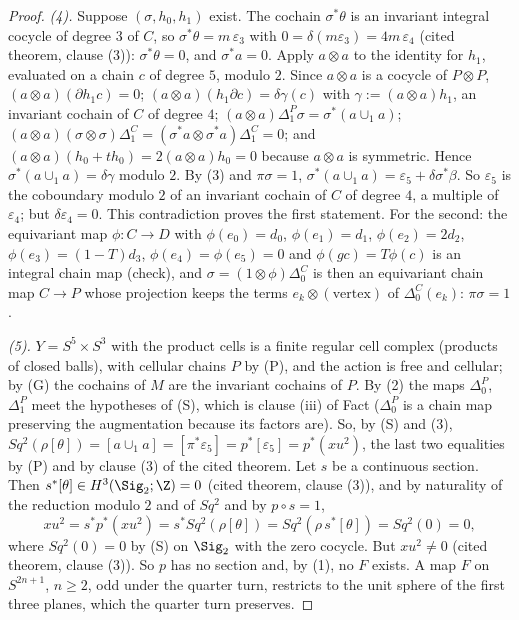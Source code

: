 \begin{proof}
\emph{(4).} Suppose $(\sigma, h_{0}, h_{1})$ exist. The cochain $\sigma^{*}\theta$ is an invariant integral cocycle of degree $3$ of $C$, so $\sigma^{*}\theta = m\,\varepsilon_{3}$ with $0 = \delta(m\varepsilon_{3}) = 4m\,\varepsilon_{4}$ (cited theorem, clause (3)): $\sigma^{*}\theta = 0$, and $\sigma^{*}a = 0$. Apply $a \otimes a$ to the identity for $h_{1}$, evaluated on a chain $c$ of degree $5$, modulo $2$. Since $a \otimes a$ is a cocycle of $P \otimes P$, $(a \otimes a)(\partial h_{1}c) = 0$; $(a \otimes a)(h_{1}\partial c) = \delta\gamma(c)$ with $\gamma := (a \otimes a)h_{1}$, an invariant cochain of $C$ of degree $4$; $(a \otimes a)\Delta_{1}^{P}\sigma = \sigma^{*}(a \cup_{1} a)$; $(a \otimes a)(\sigma \otimes \sigma)\Delta_{1}^{C} = (\sigma^{*}a \otimes \sigma^{*}a)\Delta_{1}^{C} = 0$; and $(a \otimes a)(h_{0} + th_{0}) = 2(a \otimes a)h_{0} = 0$ because $a \otimes a$ is symmetric. Hence $\sigma^{*}(a \cup_{1} a) = \delta\gamma$ modulo $2$. By (3) and $\pi\sigma = 1$, $\sigma^{*}(a \cup_{1} a) = \varepsilon_{5} + \delta\sigma^{*}\beta$. So $\varepsilon_{5}$ is the coboundary modulo $2$ of an invariant cochain of $C$ of degree $4$, a multiple of $\varepsilon_{4}$; but $\delta\varepsilon_{4} = 0$. This contradiction proves the first statement. For the second: the equivariant map $\phi : C \to D$ with $\phi(e_{0}) = d_{0}$, $\phi(e_{1}) = d_{1}$, $\phi(e_{2}) = 2d_{2}$, $\phi(e_{3}) = (1 - T)d_{3}$, $\phi(e_{4}) = \phi(e_{5}) = 0$ and $\phi(gc) = T\phi(c)$ is an integral chain map (check), and $\sigma = (1 \otimes \phi)\Delta_{0}^{C}$ is then an equivariant chain map $C \to P$ whose projection keeps the terms $e_{k} \otimes (\text{vertex})$ of $\Delta_{0}^{C}(e_{k})$: $\pi\sigma = 1$.

\emph{(5).} $Y = S^{5} \times S^{3}$ with the product cells is a finite regular cell complex (products of closed balls), with cellular chains $P$ by (P), and the action is free and cellular; by (G) the cochains of $M$ are the invariant cochains of $P$. By (2) the maps $\Delta_{0}^{P}$, $\Delta_{1}^{P}$ meet the hypotheses of (S), which is clause (iii) of Fact  ($\Delta_{0}^{P}$ is a chain map preserving the augmentation because its factors are). So, by (S) and (3), $Sq^{2}(\rho[\theta]) = [a \cup_{1} a] = [\pi^{*}\varepsilon_{5}] = p^{*}[\varepsilon_{5}] = p^{*}(xu^{2})$, the last two equalities by (P) and by clause (3) of the cited theorem. Let $s$ be a continuous section. Then $s^{*}[\theta] \in H^{3}(\Sig_{2}; \Z) = 0$ (cited theorem, clause (3)), and by naturality of the reduction modulo $2$ and of $Sq^{2}$ and by $p \circ s = 1$,
\[
xu^{2} = s^{*}p^{*}(xu^{2}) = s^{*}Sq^{2}(\rho[\theta]) = Sq^{2}(\rho\,s^{*}[\theta]) = Sq^{2}(0) = 0,
\]
where $Sq^{2}(0) = 0$ by (S) on $\Sig_{2}$ with the zero cocycle. But $xu^{2} \neq 0$ (cited theorem, clause (3)). So $p$ has no section and, by (1), no $F$ exists. A map $F$ on $S^{2n+1}$, $n \geq 2$, odd under the quarter turn, restricts to the unit sphere of the first three planes, which the quarter turn preserves.


\end{proof}

